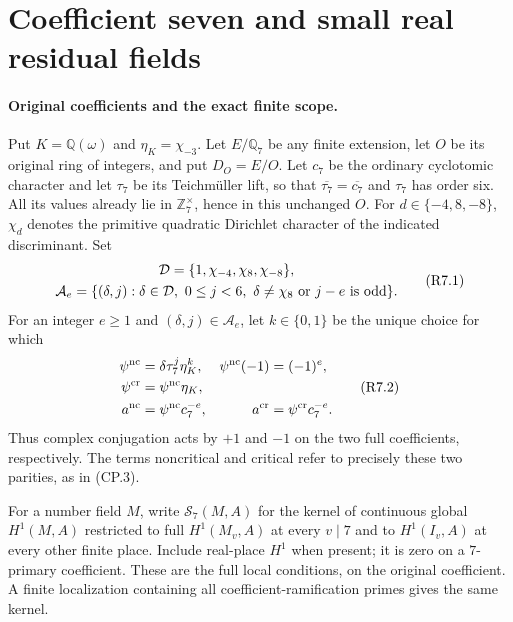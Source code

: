 \section{Coefficient seven and small real residual fields}
\label{sec:coefficient-seven-real-residual}

\paragraph{Original coefficients and the exact finite scope.}
Put $K=\mathbb Q(\omega)$ and $\eta_K=\chi_{-3}$.
Let $E/\mathbb Q_7$ be any finite extension, let $O$ be its original
ring of integers, and put $D_O=E/O$.
Let $c_7$ be the ordinary cyclotomic character and let $\tau_7$ be
its Teichm\"uller lift, so that $\overline{\tau_7}=\overline{c_7}$
and $\tau_7$ has order six. All its values already lie in
$\mathbb Z_7^\times$, hence in this unchanged $O$.
For $d\in\{-4,8,-8\}$, $\chi_d$ denotes the primitive quadratic
Dirichlet character of the indicated discriminant. Set
\[
 \begin{gathered}
 \mathcal D=\{1,\chi_{-4},\chi_8,\chi_{-8}\},\\
 \mathcal A_e=
 \{(\delta,j):\delta\in\mathcal D,\ 0\leq j<6,
       \ \delta\ne\chi_8\ \hbox{or }j-e\hbox{ is odd}\}.
 \end{gathered}
 \tag{R7.1}
\]
For an integer $e\geq1$ and $(\delta,j)\in\mathcal A_e$, let
$k\in\{0,1\}$ be the unique choice for which
\[
 \begin{aligned}
 \psi^{\rm nc}&=\delta\tau_7^j\eta_K^k,
 &\psi^{\rm nc}(-1)&=(-1)^e,\\
 \psi^{\rm cr}&=\psi^{\rm nc}\eta_K,\\
 a^{\rm nc}&=\psi^{\rm nc}c_7^{-e},
 &a^{\rm cr}&=\psi^{\rm cr}c_7^{-e}.
 \end{aligned}\tag{R7.2}
\]
Thus complex conjugation acts by $+1$ and $-1$ on the two full
coefficients, respectively. The terms noncritical and critical
refer to precisely these two parities, as in (CP.3).

For a number field $M$, write $\mathcal S_7(M,A)$ for the kernel
of continuous global $H^1(M,A)$ restricted to full $H^1(M_v,A)$
at every $v\mid7$ and to $H^1(I_v,A)$ at every other finite place.
Include real-place $H^1$ when present; it is zero on a
$7$-primary coefficient. These are the full local conditions,
on the original coefficient. A finite localization containing
all coefficient-ramification primes gives the same kernel.

